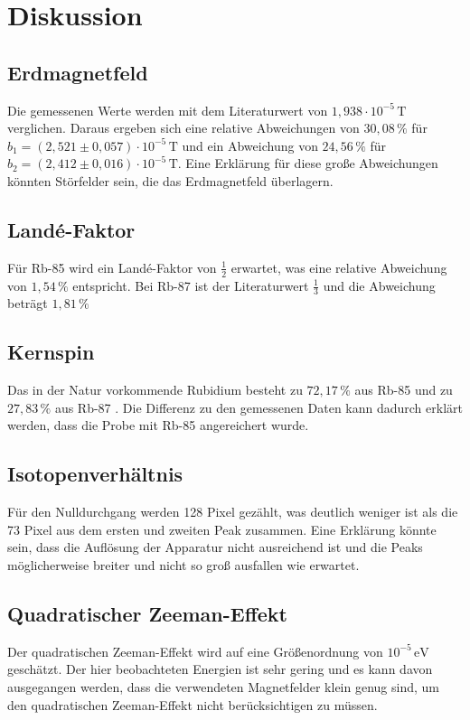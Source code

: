 \section{Diskussion}
\label{sec:Diskussion}

\subsection{Erdmagnetfeld}
\label{sec:Diskussion}

Die gemessenen Werte werden mit dem Literaturwert von $1,938 \cdot 10^{-5} \, \unit{\tesla}$ \cite{Pfeiler2017} verglichen.
Daraus ergeben sich eine relative Abweichungen von $30,08 \, \%$ für $b_1 = \left( 2,521 \pm 0,057 \right) \cdot 10^{-5}\, \unit{\tesla}$ und ein 
Abweichung von $24,56 \, \% $ für $b_2 = \left( 2,412  \pm 0,016 \right) \cdot 10^{-5}\, \unit{\tesla}$.
Eine Erklärung für diese große Abweichungen könnten Störfelder sein, die das Erdmagnetfeld überlagern.\\


\subsection{Landé-Faktor}


Für Rb-85 wird ein Landé-Faktor von $\frac{1}{2} $ erwartet, was eine relative Abweichung von $1,54 \, \%$ entspricht.
Bei Rb-87 ist der Literaturwert $\frac{1}{3}$ und die Abweichung beträgt $1,81 \, \%$\\


\subsection{Kernspin}


Das in der Natur vorkommende Rubidium besteht zu $72,17 \, \%$ aus Rb-85 und zu $27,83 \, \%$ aus Rb-87 \cite{Pfeiler2017} .
Die Differenz zu den gemessenen Daten kann dadurch erklärt werden, dass die Probe mit Rb-85 angereichert wurde.\\


\subsection{Isotopenverhältnis}

Für den Nulldurchgang werden 128 Pixel gezählt, was deutlich weniger ist als die 73 Pixel aus dem ersten und zweiten Peak zusammen.
Eine Erklärung könnte sein, dass die Auflösung der Apparatur nicht ausreichend ist und die Peaks möglicherweise breiter und nicht so groß ausfallen wie erwartet.\\


\subsection{Quadratischer Zeeman-Effekt}

Der quadratischen Zeeman-Effekt wird auf eine Größenordnung von $10^{-5} \, \unit{\electronvolt}$ geschätzt.
Der hier beobachteten Energien ist sehr gering und es kann davon ausgegangen werden, dass
die verwendeten Magnetfelder klein genug sind, um den quadratischen Zeeman-Effekt nicht berücksichtigen zu müssen. 